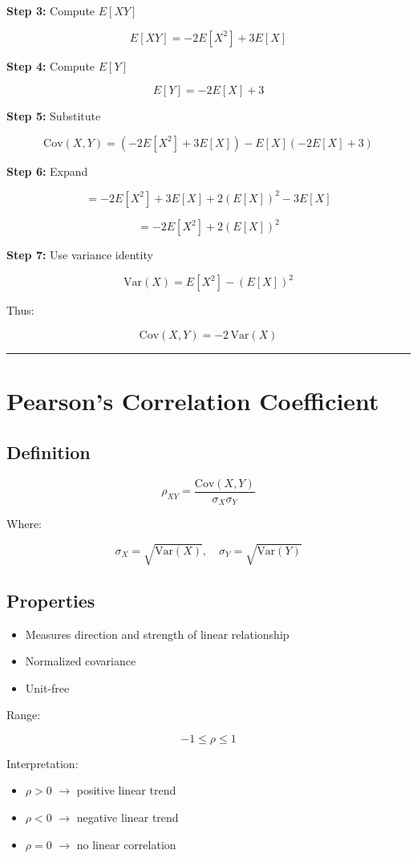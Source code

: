 \documentclass[12pt]{article}
\begin{document}
\textbf{Step 3:} Compute $E[XY]$

\[
E[XY] = -2E[X^2] + 3E[X]
\]

\textbf{Step 4:} Compute $E[Y]$

\[
E[Y] = -2E[X] + 3
\]

\textbf{Step 5:} Substitute

\[
\mathrm{Cov}(X,Y) = (-2E[X^2] + 3E[X]) - E[X](-2E[X] + 3)
\]

\textbf{Step 6:} Expand

\[
= -2E[X^2] + 3E[X] + 2(E[X])^2 - 3E[X]
\]

\[
= -2E[X^2] + 2(E[X])^2
\]

\textbf{Step 7:} Use variance identity

\[
\mathrm{Var}(X) = E[X^2] - (E[X])^2
\]

Thus:

\[
\mathrm{Cov}(X,Y) = -2 \, \mathrm{Var}(X)
\]

\hrule
\vspace{0.5cm}

\section{Pearson’s Correlation Coefficient}

\subsection{Definition}

\[
\rho_{XY} = \frac{\mathrm{Cov}(X,Y)}{\sigma_X \sigma_Y}
\]

Where:

\[
\sigma_X = \sqrt{\mathrm{Var}(X)}, \quad \sigma_Y = \sqrt{\mathrm{Var}(Y)}
\]

\subsection{Properties}

\begin{itemize}
\item Measures direction and strength of linear relationship
\item Normalized covariance
\item Unit-free
\end{itemize}

Range:

\[
-1 \leq \rho \leq 1
\]

Interpretation:

\begin{itemize}
\item $\rho > 0$ $\rightarrow$ positive linear trend
\item $\rho < 0$ $\rightarrow$ negative linear trend
\item $\rho = 0$ $\rightarrow$ no linear correlation
\end{itemize}
\end{document}
